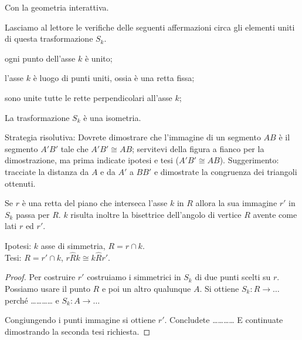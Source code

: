 Con la geometria interattiva.



Lasciamo al lettore le verifiche delle seguenti affermazioni circa 
gli elementi uniti di questa trasformazione \(S_k\).
\begin{itemize*}
\item ogni punto dell'asse \(k\) è unito;
\item l'asse \(k\) è luogo di punti uniti, ossia è una retta fissa;
\item sono unite tutte le rette perpendicolari all'asse \(k\);
\end{itemize*}
\setlength{\intextsep}{\defintextsep}

\begin{teorema}\label{teo:8.3}
La trasformazione \(S_k\) è una isometria.
\end{teorema}

\noindent\begin{minipage}{0.65\textwidth}\parindent15pt
Strategia risolutiva:
Dovrete dimostrare che l'immagine di un segmento \(AB\) è il segmento 
\(A'B'\) tale che \(A'B'\cong AB\); servitevi della figura a fianco per 
la dimostrazione, ma prima indicate ipotesi e tesi (\(A'B'\cong AB\)).
Suggerimento: tracciate la distanza da \(A\) e da \(A'\) a \(BB'\) e 
dimostrate la congruenza dei triangoli ottenuti.
\end{minipage}\hfil
\begin{minipage}{0.35\textwidth}
  \centering
\end{minipage}\vspace{5pt}

\begin{teorema}\label{teo:8.4}
Se \(r\) è una retta del piano che interseca l'asse \(k\) in \(R\) allora 
la sua immagine \(r'\) in \(S_k\) passa per \(R\). \(k\) risulta inoltre la 
bisettrice dell'angolo di vertice \(R\) avente come lati \(r\) ed \(r'\).
\end{teorema}

\noindent\begin{minipage}{0.65\textwidth}\parindent15pt
\noindent Ipotesi: \(k\) asse di simmetria, \(R=r\cap k\).\\
Tesi: \(R=r'\cap k\), \(r\widehat{R}k\cong k\widehat{R}r'\).

\begin{proof}
Per costruire \(r'\) costruiamo i simmetrici in \(S_k\) di due punti 
scelti su \(r\). Possiamo usare il punto \(R\) e poi un altro qualunque 
\(A\). Si ottiene \(S_k: R \rightarrow \ldots{}\) perché 
\ldots\ldots\ldots\ldots{} e \(S_k: A \rightarrow \ldots{}\)

Congiungendo i punti immagine si ottiene \(r'\). Concludete 
\ldots\ldots\ldots\ldots{}
E continuate dimostrando la seconda tesi richiesta.
\end{proof}
\end{minipage}\hfil
\begin{minipage}{0.35\textwidth}
  \centering
\end{minipage}\vspace{5pt}


